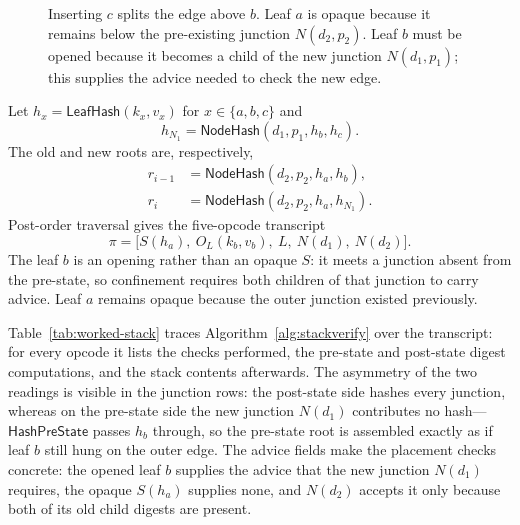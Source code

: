 \documentclass[11pt]{article}
\begin{document}
\begin{figure}[htb]
  \caption{Inserting $c$ splits the edge above $b$. Leaf $a$ is opaque because it remains below the pre-existing junction $N(d_2,p_2)$. Leaf $b$ must be opened because it becomes a child of the new junction $N(d_1,p_1)$; this supplies the advice needed to check the new edge.}
  \label{fig:worked-insertion}
\end{figure}

Let $h_x=\mathsf{LeafHash}(k_x,v_x)$ for $x\in\{a,b,c\}$ and
\[
  h_{N_1}=\mathsf{NodeHash}(d_1,p_1,h_b,h_c).
\]
The old and new roots are, respectively,
\begin{align*}
  r_{i-1}&=\mathsf{NodeHash}(d_2,p_2,h_a,h_b),\\
  r_i&=\mathsf{NodeHash}(d_2,p_2,h_a,h_{N_1}).
\end{align*}
Post-order traversal gives the five-opcode transcript
\[
  \pi=\bigl[S(h_a),\ O_L(k_b,v_b),\ L,\ N(d_1),\ N(d_2)\bigr].
\]
The leaf $b$ is an opening rather than an opaque $S$: it meets a junction absent from the pre-state, so confinement requires both children of that junction to carry advice. Leaf $a$ remains opaque because the outer junction existed previously.

Table~\ref{tab:worked-stack} traces Algorithm~\ref{alg:stackverify} over the transcript: for every opcode it lists the checks performed, the pre-state and post-state digest computations, and the stack contents afterwards. The asymmetry of the two readings is visible in the junction rows: the post-state side hashes every junction, whereas on the pre-state side the new junction $N(d_1)$ contributes no hash---$\mathsf{HashPreState}$ passes $h_b$ through, so the pre-state root is assembled exactly as if leaf $b$ still hung on the outer edge. The advice fields make the placement checks concrete: the opened leaf $b$ supplies the advice that the new junction $N(d_1)$ requires, the opaque $S(h_a)$ supplies none, and $N(d_2)$ accepts it only because both of its old child digests are present.
\end{document}
